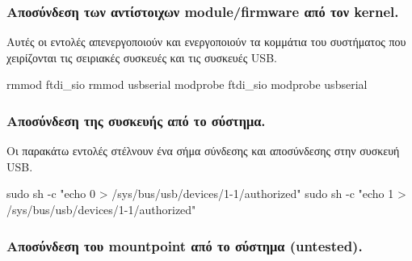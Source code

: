 \documentclass[
  a4paper,
  twoside,
  titlepage,
  12pt]{article}
\newenvironment{Shaded}{\begin{snugshade}}{\end{snugshade}}
\newcommand{\AttributeTok}[1]{\textcolor[rgb]{0.77,0.63,0.00}{#1}}
\newcommand{\ExtensionTok}[1]{#1}
\newcommand{\FunctionTok}[1]{\textcolor[rgb]{0.00,0.00,0.00}{#1}}
\newcommand{\NormalTok}[1]{#1}
\newcommand{\StringTok}[1]{\textcolor[rgb]{0.31,0.60,0.02}{#1}}
\numberwithin{equation}{section}
\numberwithin{figure}{section}
\numberwithin{table}{section}
\begin{document}
\hypertarget{ux3b1ux3c0ux3bfux3c3ux3cdux3bdux3b4ux3b5ux3c3ux3b7-ux3c4ux3c9ux3bd-ux3b1ux3bdux3c4ux3afux3c3ux3c4ux3bfux3b9ux3c7ux3c9ux3bd-modulefirmware-ux3b1ux3c0ux3cc-ux3c4ux3bfux3bd-kernel.}{%
\subsubsection{Αποσύνδεση των αντίστοιχων module/firmware από τον kernel.}\label{ux3b1ux3c0ux3bfux3c3ux3cdux3bdux3b4ux3b5ux3c3ux3b7-ux3c4ux3c9ux3bd-ux3b1ux3bdux3c4ux3afux3c3ux3c4ux3bfux3b9ux3c7ux3c9ux3bd-modulefirmware-ux3b1ux3c0ux3cc-ux3c4ux3bfux3bd-kernel.}}

Αυτές οι εντολές απενεργοποιούν και ενεργοποιούν τα κομμάτια του συστήματος που χειρίζονται τις σειριακές συσκευές και τις συσκευές USB.

\begin{Shaded}
\begin{Highlighting}[]
\ExtensionTok{rmmod}\NormalTok{  ftdi\_sio}
\ExtensionTok{rmmod}\NormalTok{  usbserial}
\ExtensionTok{modprobe}\NormalTok{ ftdi\_sio}
\ExtensionTok{modprobe}\NormalTok{ usbserial}
\end{Highlighting}
\end{Shaded}

\hypertarget{ux3b1ux3c0ux3bfux3c3ux3cdux3bdux3b4ux3b5ux3c3ux3b7-ux3c4ux3b7ux3c2-ux3c3ux3c5ux3c3ux3baux3b5ux3c5ux3aeux3c2-ux3b1ux3c0ux3cc-ux3c4ux3bf-ux3c3ux3cdux3c3ux3c4ux3b7ux3bcux3b1.}{%
\subsubsection{Αποσύνδεση της συσκευής από το σύστημα.}\label{ux3b1ux3c0ux3bfux3c3ux3cdux3bdux3b4ux3b5ux3c3ux3b7-ux3c4ux3b7ux3c2-ux3c3ux3c5ux3c3ux3baux3b5ux3c5ux3aeux3c2-ux3b1ux3c0ux3cc-ux3c4ux3bf-ux3c3ux3cdux3c3ux3c4ux3b7ux3bcux3b1.}}

Οι παρακάτω εντολές στέλνουν ένα σήμα σύνδεσης και αποσύνδεσης στην συσκευή USB.

\begin{Shaded}
\begin{Highlighting}[]
\FunctionTok{sudo}\NormalTok{ sh }\AttributeTok{{-}c} \StringTok{"echo 0 \textgreater{} /sys/bus/usb/devices/1{-}1/authorized"}
\FunctionTok{sudo}\NormalTok{ sh }\AttributeTok{{-}c} \StringTok{"echo 1 \textgreater{} /sys/bus/usb/devices/1{-}1/authorized"}
\end{Highlighting}
\end{Shaded}

\hypertarget{ux3b1ux3c0ux3bfux3c3ux3cdux3bdux3b4ux3b5ux3c3ux3b7-ux3c4ux3bfux3c5-mountpoint-ux3b1ux3c0ux3cc-ux3c4ux3bf-ux3c3ux3cdux3c3ux3c4ux3b7ux3bcux3b1-untested.}{%
\subsubsection{Αποσύνδεση του mountpoint από το σύστημα (untested).}\label{ux3b1ux3c0ux3bfux3c3ux3cdux3bdux3b4ux3b5ux3c3ux3b7-ux3c4ux3bfux3c5-mountpoint-ux3b1ux3c0ux3cc-ux3c4ux3bf-ux3c3ux3cdux3c3ux3c4ux3b7ux3bcux3b1-untested.}}
\end{document}
